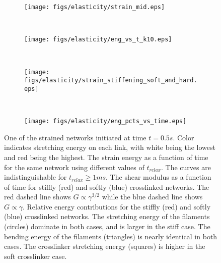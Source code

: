 \documentclass[12pt]{article}
\begin{document}
\begin{figure}[H]
  \begin{subfigure}{0.3\textwidth}
    \centering
    \texttt{[image: figs/elasticity/strain\_mid.eps]}
    \caption{\label{fig:lees-edwards}}
  \end{subfigure}
  ~
  \begin{subfigure}{0.4\textwidth}
    \centering
    \texttt{[image: figs/elasticity/eng\_vs\_t\_k10.eps]}
    \caption{\label{fig:tRelax10}}
  \end{subfigure}
  ~
  \begin{subfigure}{0.5\textwidth}
    \centering
    \texttt{[image: figs/elasticity/strain\_stiffening\_soft\_and\_hard.eps]}
    \caption{\label{fig:strain_stiffening}}
  \end{subfigure}
  ~
  \begin{subfigure}{0.5\textwidth}
    \centering
    \texttt{[image: figs/elasticity/eng\_pcts\_vs\_time.eps]}
    \caption{\label{fig:energy_contribs}}
  \end{subfigure}
  \caption{%
    \label{fig:stress}%
     One of the strained networks initiated at time $t= 0.5s$. Color indicates stretching energy
    on each link, with white being the lowest and red being the highest.  The strain energy as a
    function of time for the same network using different values of $t_{relax}$. The curves are indistinguishable for
    $t_{relax} \ge 1ms$.  The shear modulus as a function of time for stiffly (red) and softly
    (blue) crosslinked networks. The red dashed line shows $G\propto\gamma^{3/2}$ while the blue dashed line shows
    $G\propto\gamma$.  Relative energy contributions for the stiffly (red) and softly (blue)
    crosslinked networks. The stretching energy of the filaments (circles) dominate in both cases, and is larger
    in the stiff case. The bending energy of the filaments (triangles) is nearly identical in both cases. The
    crosslinker stretching energy (squares) is higher in the soft crosslinker case.
  }
\end{figure}  
\end{document}
